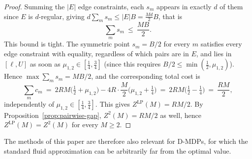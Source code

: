 \documentclass{article}
\begin{document}
\begin{proof}
Summing the $|E|$ edge constraints, each $s_m$ appears in exactly $d$ of them since $E$ is
$d$-regular, giving $d\sum_m s_m \leq |E| B = \frac{Md}{2} B$, that is
\[
\sum_m s_m \ \leq\ \frac{MB}{2}.
\]
This bound is tight. The symmetric point $s_m = B/2$ for every $m$ satisfies every edge constraint
with equality, regardless of which pairs are in $E$, and lies in $[\ell,U]$ as soon as $\mu_{1,2}
\in [\tfrac14,\tfrac34]$ (since this requires $B/2 \leq \min(\tfrac12,\mu_{1,2})$). Hence $\max
\sum_m s_m = MB/2$, and the corresponding total cost is
\[
\sum_m c_m \ =\ 2RM\Big(\tfrac12+\mu_{1,2}\Big) - 4R \cdot \frac{M}{2}\Big(\mu_{1,2}+\tfrac14\Big) \ =\ 2RM\Big(\tfrac12-\tfrac14\Big) \ =\ \frac{RM}{2},\]
independently of $\mu_{1,2} \in [\tfrac14,\tfrac34]$. This gives $Z^{\mathrm{LP}}(M) = RM/2$. By
Proposition~\ref{prop:pairwise-gap}, $Z^2(M) = RM/2$ as well,
hence $Z^{\mathrm{LP}}(M) = Z^2(M)$ for every $M \geq 2$.
\end{proof}

The methods of this paper are therefore also relevant
for D-MDPs, for which the standard fluid approximation can be arbitrarily far from the optimal value.
\end{document}
